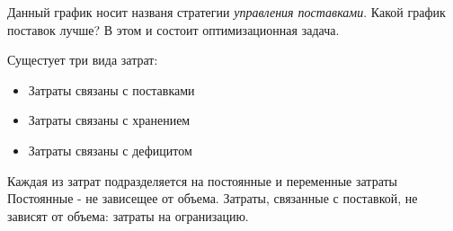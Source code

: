 \documentclass[aps,%
12pt,%
final,%
oneside,
onecolumn,%
musixtex, %
superscriptaddress,%
centertags]{article} %
\begin{document}
Данный график носит названя стратегии \textit{управления поставками}. Какой график поставок лучше?
В этом и состоит оптимизационная задача.

Сущестует три вида затрат:
\begin{itemize}
	\item Затраты связаны с поставками
	\item Затраты связаны с хранением
	\item Затраты связаны с дефицитом
\end{itemize}

Каждая из затрат подразделяется на постоянные и переменные затраты
Постоянные - не зависещее от объема. Затраты, связанные с поставкой, не зависят от объема: затраты на огранизацию.
\end{document}
